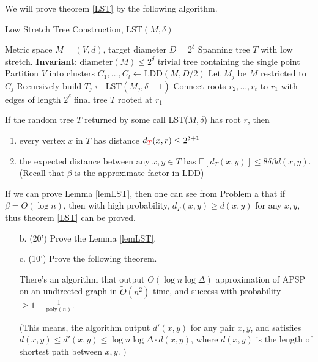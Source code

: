 We will prove theorem \ref{LST} by the following algorithm. 

\begin{algorithm}[H]
\caption{Low Stretch Tree Construction, LST$(M, \delta)$}
\label{alg:lst}
\begin{algorithmic}[1]
\Require Metric space $M=(V,d)$, target diameter $D=2^\delta$
\Ensure Spanning tree $T$ with low stretch.  \textbf{Invariant}: $\mathrm{diameter}(M) \leq 2^\delta$
    \State \Return trivial tree containing the single point
\EndIf
\State Partition $V$ into clusters $C_1,\dots,C_t \gets \mathrm{LDD}(M, D/2)$ 
    \State Let $M_j$ be $M$ restricted to $C_j$
    \State Recursively build $T_j \gets \mathrm{LST}(M_j, \delta-1)$
\EndFor
\State Connect roots $r_2,\dots,r_t$ to $r_1$ with edges of length $2^\delta$
\State \Return final tree $T$ rooted at $r_1$
\end{algorithmic}
\end{algorithm}

\begin{lemma}\label{lemLST}
    If the random tree $T$ returned by some call LST($M, \delta$) has root $r$, then 
    \begin{enumerate}
        \item every vertex $x$ in $T$ has distance $d_{\textcolor{red}{T}}(x, r) \le 2 ^ {\delta + 1}$
        \item the expected distance between any $x, y\in T$ has $\mathbb{E}[d_T(x, y)] \le 8 \delta \beta d(x, y)$. (Recall that $\beta$ is the approximate factor in LDD) 
    \end{enumerate}
\end{lemma}

If we can prove Lemma \ref{lemLST}, then one can see from Problem a that if $\beta = O(\log n)$, then with high probability, $d_T(x, y) \ge d(x, y)$ for any $x, y$, thus theorem \ref{LST} can be proved. 


    \begin{itemize}
        \item [b. (20')] Prove the Lemma \ref{lemLST}. 
    \end{itemize}


    
    \begin{itemize}
        \item [c. (10')] Prove the following theorem. 

        \begin{theorem}
            There's an algorithm that output $O(\log n\log \Delta)$ approximation of APSP on an undirected graph in $\tilde{O}(n ^ 2)$ time, and success with probability $\ge 1 - \frac 1{\text{poly}(n)}$.
        \end{theorem}


        (This means, the algorithm output $d'(x, y)$ for any pair $x, y$, and satisfies $d(x, y) \le d'(x, y) \le \log n\log \Delta \cdot d(x, y)$, where $d(x, y)$ is the length of shortest path between $x, y$. )
    \end{itemize}


